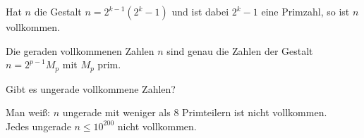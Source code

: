 \setcounter{countfalko}{5}
\begin{falko}	\label{F7.6}
	Hat $n$ die Gestalt $n = 2^{k-1} (2^k-1)$ und ist dabei $2^k - 1$ eine Primzahl, so ist $n$ vollkommen.
\end{falko}

\begin{falko}	\label{F7.7}
	Die geraden vollkommenen Zahlen $n$ sind genau die Zahlen der Gestalt $n = 2^{p-1} M_p$ mit $M_p$ prim.
\end{falko}

	Gibt es ungerade vollkommene Zahlen?
	
	Man weiß: $n$ ungerade mit weniger als 8 Primteilern ist nicht vollkommen. \\
	Jedes ungerade $n \leq 10^{200}$ nicht vollkommen.
\newpage